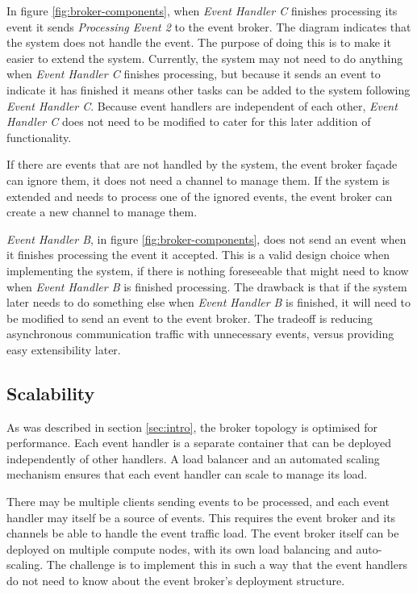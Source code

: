 In figure \ref{fig:broker-components}, when \emph{Event Handler C} finishes processing its event it sends \emph{Processing Event 2} to the event broker.
The diagram indicates that the system does not handle the event.
The purpose of doing this is to make it easier to extend the system.
Currently, the system may not need to do anything when \emph{Event Handler C} finishes processing,
but because it sends an event to indicate it has finished it means other tasks can be added to the system following \emph{Event Handler C}.
Because event handlers are independent of each other, \emph{Event Handler C} does not need to be modified to cater for this later addition of functionality.

If there are events that are not handled by the system, the event broker façade can ignore them, it does not need a channel to manage them.
If the system is extended and needs to process one of the ignored events, the event broker can create a new channel to manage them.

\emph{Event Handler B}, in figure \ref{fig:broker-components}, does not send an event when it finishes processing the event it accepted.
This is a valid design choice when implementing the system,
if there is nothing foreseeable that might need to know when \emph{Event Handler B} is finished processing.
The drawback is that if the system later needs to do something else when \emph{Event Handler B} is finished,
it will need to be modified to send an event to the event broker.
The tradeoff is reducing asynchronous communication traffic with unnecessary events, versus providing easy extensibility later.

\subsection{Scalability}

As was described in section \ref{sec:intro}, the broker topology is optimised for performance.
Each event handler is a separate container that can be deployed independently of other handlers.
A load balancer and an automated scaling mechanism ensures that each event handler can scale to manage its load.

There may be multiple clients sending events to be processed,
and each event handler may itself be a source of events.
This requires the event broker and its channels be able to handle the event traffic load.
The event broker itself can be deployed on multiple compute nodes, with its own load balancing and auto-scaling.
The challenge is to implement this in such a way that the event handlers do not need to know about the event broker's deployment structure.

